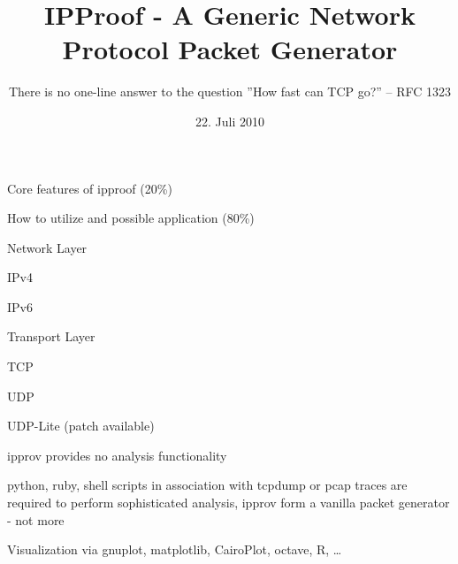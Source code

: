 \documentclass[9pt]{article}
\begin{document}
\title{IPProof - A Generic Network Protocol Packet Generator}

\subtitle{\textsf{There is no one-line answer to the question ''How fast can TCP go?'' -- RFC 1323}}


\email{}
\date{\textsf{22. Juli 2010}}
\maketitle


\begin{slide}
\bi
	\item Core features of ipproof (20\%)
	\item How to utilize and possible application (80\%)
\ei
\end{slide}


\begin{slide}
\bi
	\item Network Layer
	\bi
		\item IPv4
		\item IPv6
	\ei
	\item Transport Layer
	\bi
		\item TCP
		\item UDP
		\item UDP-Lite (patch available)
	\ei
\ei
\end{slide}


\begin{slide}
\bi
	\item ipprov provides no analysis functionality
	\item python, ruby, shell scripts in association with tcpdump or pcap traces are required to perform sophisticated analysis,
	ipprov form a vanilla packet generator - not more
	\item Visualization via gnuplot, matplotlib, CairoPlot, octave, R, \dots
\ei
\end{slide}
\end{document}
